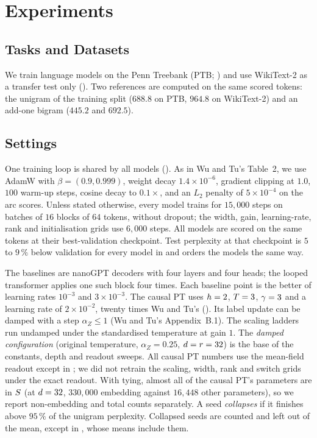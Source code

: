 \section{Experiments}
\label{sec:experiments}

\subsection{Tasks and Datasets}
\label{sec:tasks}

We train language models on the Penn Treebank (PTB; \citealp{marcus1993building}) and use
WikiText-2 \citep{merity2017pointer} as a transfer test only (). Two
references are computed on the same scored tokens: the unigram of the training split ($688.8$ on
PTB, $964.8$ on WikiText-2) and an add-one bigram ($445.2$ and $692.5$).

\subsection{Settings}
\label{sec:settings}

One training loop is shared by all models (). As in Wu and Tu's Table~2, we
use AdamW with $\beta=(0.9,0.999)$, weight decay $1.4\times10^{-6}$, gradient clipping at $1.0$,
$100$ warm-up steps, cosine decay to $0.1\times$, and an $L_2$ penalty of $5\times10^{-4}$ on the
arc scores. Unless stated otherwise, every model trains for $15{,}000$ steps on batches of $16$
blocks of $64$ tokens, without dropout; the width, gain, learning-rate, rank and initialisation
grids use $6{,}000$ steps. All models are scored on the same tokens at their best-validation checkpoint. Test perplexity at that checkpoint is $5$ to $9\,\%$ below
validation for every model in  and orders the models the same way.

The baselines are nanoGPT decoders \citep{karpathy2022nanogpt} with four layers and four heads;
the looped transformer applies one such block four times. Each baseline point is the better of
learning rates $10^{-3}$ and $3\times10^{-3}$. The causal PT uses $h=2$, $T=3$,
$\gamma=3$ and a learning rate of $2\times10^{-2}$, twenty times Wu and Tu's
(). Its label update can be damped with a step $\alpha_Z\le1$ (Wu and Tu's
Appendix~B.1). The scaling ladders run undamped under the standardised temperature at gain $1$.
The \emph{damped configuration} (original temperature, $\alpha_Z=0.25$, $d=r=32$) is
the base of the constants, depth and readout sweeps. All causal PT numbers use the mean-field readout except in ; we did
not retrain the scaling, width, rank and switch grids under the exact readout. With tying,
almost all of the causal PT's parameters are in $S$ (at $d=32$, $330{,}000$ embedding
against $16{,}448$ other parameters), so we report non-embedding and total counts separately. A
seed \emph{collapses} if it finishes above $95\,\%$ of the unigram perplexity. Collapsed seeds
are counted and left out of the mean, except in , whose means include them.

